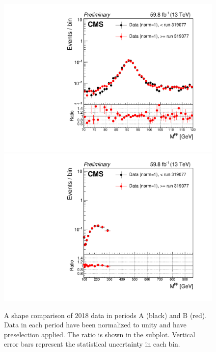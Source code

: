 \begin{figure}[H]
    \centering
    {\includegraphics[width=.49\textwidth]{Images/Analysis/Results_HEMFailureStudyPlots_Data_BeforeAfterRun319077/BasicLQ_uujj_M_uu_controlzoom_ZRegion.pdf}}
    {\includegraphics[width=.49\textwidth]{Images/Analysis/Results_HEMFailureStudyPlots_Data_BeforeAfterRun319077/BasicLQ_uujj_M_uu_controlzoom_TTRegion.pdf}}
    \caption{A shape comparison of 2018 data in periods A (black) and B (red). Data in each period have been normalized to unity and have preselection applied. The ratio \RatioDataAB is shown in the subplot. Vertical error bars represent the statistical uncertainty in each bin.}
    \label{figapp:hemMuuZoom}
\end{figure}

